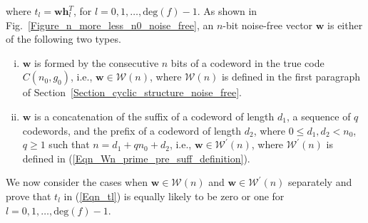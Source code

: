 \documentclass[10pt,journal]{IEEEtran}
\def \deg{{\mathrm{deg}}}
\def \Fig {Fig.}
\begin{document}
% 
where $t_l = \mathbf{w}\mathbf{h}_l^T$, for $l = 0,1,\ldots,\deg(f)-1$.
% 
As shown in \Fig~\ref{Figure_n_more_less_n0_noise_free}, an $n$-bit noise-free vector $\mathbf{w}$ is either 
of the following two types.
% 
\begin{enumerate}[(i)]
%  
\item $\mathbf{w}$ is formed by the consecutive $n$ bits of a codeword in the true code $C(n_0,g_0)$, i.e., 
$\mathbf{w} \in \mathcal{W}(n)$, where $\mathcal{W}(n)$ is defined in the first paragraph of Section~\ref{Section_cyclic_structure_noise_free}.
% 
\item $\mathbf{w}$ is a concatenation of the suffix of a codeword of length $d_1$, a sequence of $q$ codewords,
and the prefix of a codeword of length $d_2$, where $0 \leq d_1,d_2 < n_0$, $q \geq 1$ such that $n=d_1+qn_0+d_2$, i.e., 
$\mathbf{w} \in \mathcal{W}^{\prime}(n)$, where $\mathcal{W}^{\prime}(n)$ is defined in (\ref{Eqn_Wn_prime_pre_suff_definition}).
% 
\end{enumerate}
% 
We now consider the cases when $\mathbf{w} \in \mathcal{W}(n)$ and $\mathbf{w} \in \mathcal{W}^{\prime}(n)$ 
separately and prove that $t_l$ in (\ref{Eqn_tl}) is equally likely to be zero or one for $l = 0,1,\ldots, \deg(f)-1$.
% 
\end{document}
